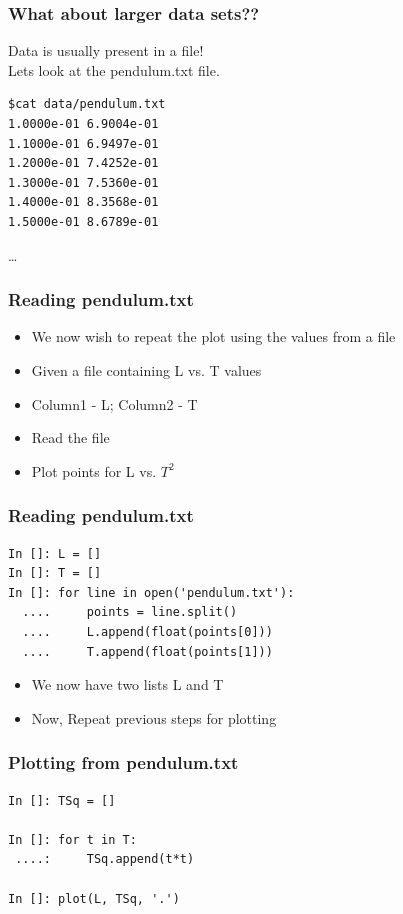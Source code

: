 \documentclass[14pt,compress]{beamer}
\begin{document}
\begin{frame}[fragile]
\frametitle{What about larger data sets??}
\alert{Data is usually present in a file!} \\
Lets look at the pendulum.txt file.
\begin{lstlisting}
$cat data/pendulum.txt
1.0000e-01 6.9004e-01
1.1000e-01 6.9497e-01
1.2000e-01 7.4252e-01
1.3000e-01 7.5360e-01
1.4000e-01 8.3568e-01
1.5000e-01 8.6789e-01
\end{lstlisting}
\ldots
\end{frame}

\begin{frame}[fragile]
\frametitle{Reading pendulum.txt}
\begin{itemize}
  \item We now wish to repeat the plot using the values from a file
  \item Given a file containing L vs. T values 
  \item Column1 - L; Column2 - T  
  \item Read the file
  \item Plot points for L vs. $T^2$ 
\end{itemize}
\end{frame}

\begin{frame}[fragile]
\frametitle{Reading pendulum.txt}
\begin{lstlisting}
In []: L = []
In []: T = []
In []: for line in open('pendulum.txt'):
  ....     points = line.split()
  ....     L.append(float(points[0]))
  ....     T.append(float(points[1]))
\end{lstlisting}
\begin{itemize}
\item We now have two lists L and T
\item Now, Repeat previous steps for plotting
\end{itemize}
\end{frame}

\begin{frame}[fragile]
\frametitle{Plotting from pendulum.txt}
\begin{lstlisting}
In []: TSq = []

In []: for t in T:
 ....:     TSq.append(t*t)

In []: plot(L, TSq, '.')
\end{lstlisting}
\end{frame}
\end{document}
